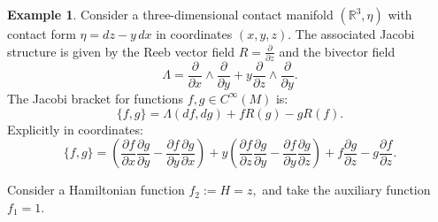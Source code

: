 \documentclass{article}
\theoremstyle{remark}
\theoremstyle{definition}
\newtheorem{example}{Example}[section]
\begin{document}
    \begin{example}\label{ex:contact-Jacobi-Cinf}
Consider a three-dimensional contact manifold $(\mathbb R^3,\eta)$ with contact form $\eta = dz - y\,dx$ in coordinates $(x,y,z)$. The associated Jacobi structure is given by the Reeb vector field $R = \frac{\partial}{\partial z}$ and the bivector field
\[
\Lambda = \frac{\partial}{\partial x} \wedge \frac{\partial}{\partial y} + y \frac{\partial}{\partial z} \wedge \frac{\partial}{\partial y}.
\]
The Jacobi bracket for functions $f,g \in C^\infty(M)$ is:
\[
\{f,g\} = \Lambda(df,dg) + f R(g) - g R(f).
\]
Explicitly in coordinates:
\[
\{f,g\} = \left(\frac{\partial f}{\partial x}\frac{\partial g}{\partial y} - \frac{\partial f}{\partial y}\frac{\partial g}{\partial x}\right) 
+ y\left(\frac{\partial f}{\partial z}\frac{\partial g}{\partial y} - \frac{\partial f}{\partial y}\frac{\partial g}{\partial z}\right)
+ f\frac{\partial g}{\partial z} - g\frac{\partial f}{\partial z}.
\]

Consider a Hamiltonian function $f_2:=H=z,$ and take the auxiliary function $f_1=1$.


\end{example}
\end{document}
